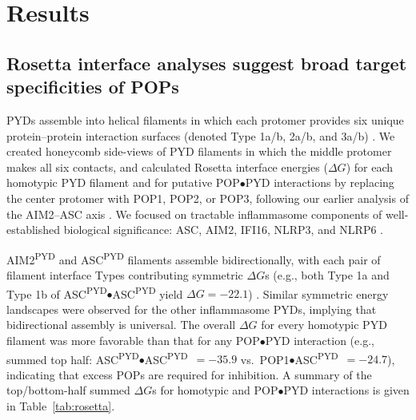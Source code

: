 \documentclass[11pt]{article}
\begin{document}
\section{Results}
\subsection{Rosetta interface analyses suggest broad target specificities of POPs}
PYDs assemble into helical filaments in which each protomer provides six unique protein--protein interaction surfaces (denoted Type 1a/b, 2a/b, and 3a/b) \citep{lu2014,luwu2015}. We created honeycomb side-views of PYD filaments in which the middle protomer makes all six contacts, and calculated Rosetta interface energies ($\Delta G$) for each homotypic PYD filament and for putative POP$\bullet$PYD interactions by replacing the center protomer with POP1, POP2, or POP3, following our earlier analysis of the AIM2--ASC axis \citep{matyszewski2021}. We focused on tractable inflammasome components of well-established biological significance: ASC, AIM2, IFI16, NLRP3, and NLRP6 \citep{brozdixit2016,hochheiser2022a,kerur2011,lu2014,luwu2015,matyszewski2018,matyszewski2021,morrone2014,morrone2015,shen2019}.

AIM2\textsuperscript{PYD} and ASC\textsuperscript{PYD} filaments assemble bidirectionally, with each pair of filament interface Types contributing symmetric $\Delta G$s (e.g., both Type 1a and Type 1b of ASC\textsuperscript{PYD}$\bullet$ASC\textsuperscript{PYD} yield $\Delta G=-22.1$) \citep{matyszewski2021}. Similar symmetric energy landscapes were observed for the other inflammasome PYDs, implying that bidirectional assembly is universal. The overall $\Delta G$ for every homotypic PYD filament was more favorable than that for any POP$\bullet$PYD interaction (e.g., summed top half: ASC\textsuperscript{PYD}$\bullet$ASC\textsuperscript{PYD}~$= -35.9$ vs.\ POP1$\bullet$ASC\textsuperscript{PYD}~$= -24.7$), indicating that excess POPs are required for inhibition. A summary of the top/bottom-half summed $\Delta G$s for homotypic and POP$\bullet$PYD interactions is given in Table~\ref{tab:rosetta}.
\end{document}
